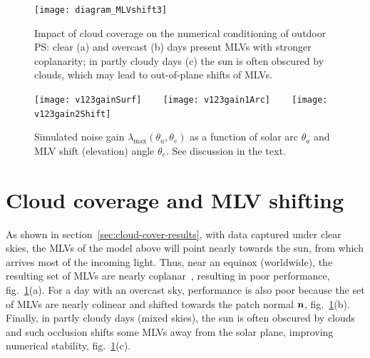 
\begin{figure}[t]
\centering
\texttt{[image: diagram\_MLVshift3]}
\caption[Impact of cloud coverage on PS conditioning]{Impact of cloud coverage on the numerical conditioning of outdoor PS: clear (a) and overcast (b) days present MLVs with stronger coplanarity; in partly cloudy days (c) the sun is often obscured by clouds, which may lead to out-of-plane shifts of MLVs.}
\label{fig:MLVshift}
\end{figure}
\begin{figure}[t]
\centering
\texttt{[image: v123gainSurf]} \ \ \ %
\texttt{[image: v123gain1Arc]} \ \ \ %
\texttt{[image: v123gain2Shift]}
\caption[Simulated noise gain as function of solar arc and mean light vector shift]{Simulated noise gain $\lambda_{\max}(\theta_a,\theta_e)$ as a function of solar arc $\theta_a$ and MLV shift (elevation) angle $\theta_e$. See discussion in the text.}
\label{fig:v123gain}
\end{figure}

\section{Cloud coverage and MLV shifting}
\label{subsec:mlv-clouds}

As shown in section~\ref{sec:cloud-cover-results}, with data captured under clear skies, the MLVs of the model above will point nearly towards the sun, from which arrives most of the incoming light. Thus, near an equinox (worldwide), the resulting set of MLVs are nearly coplanar~\cite{shen-pg-14}, resulting in poor performance, fig.~\ref{fig:MLVshift}(a). For a day with an overcast sky, performance is also poor because the set of MLVs are nearly colinear and shifted towards the patch normal ${\bf n}$, fig.~\ref{fig:MLVshift}(b). Finally, in partly cloudy days (mixed skies), the sun is often obscured by clouds and such occlusion shifts some MLVs away from the solar plane, improving numerical stability, fig.~\ref{fig:MLVshift}(c). 

